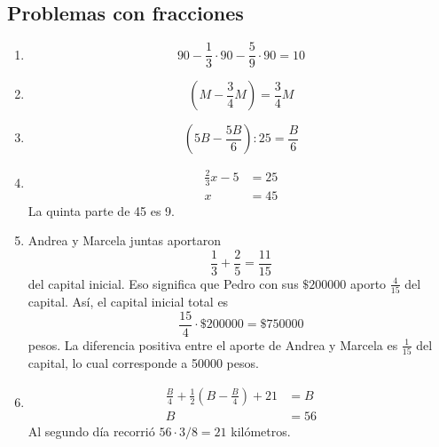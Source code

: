 \documentclass{sn-guia}
\begin{document}
\subsection{Problemas con fracciones}
\begin{enumerate}
    \item \begin{equation*}
        90 - \frac{1}{3}\cdot 90 - \frac{5}{9}\cdot 90 = 10
    \end{equation*}
    \item \begin{equation*}
        \left( M - \frac{3}{4}M \right) = \frac{3}{4}M
    \end{equation*}
    \item \begin{equation*}
        \left( 5B - \frac{5B}{6} \right): 25 = \frac{B}{6}
    \end{equation*}
    \item \begin{align*}
        \frac{2}{3}x - 5 &= 25 \\
        x &= 45
    \end{align*}
    La quinta parte de 45 es 9.
    \item Andrea y Marcela juntas aportaron 
    \begin{equation*}
        \frac{1}{3} + \frac{2}{5} = \frac{11}{15} 
    \end{equation*}
    del capital inicial. Eso significa que Pedro con sus $\$200000$ aporto $\frac{4}{15}$ del capital. Así, 
    el capital inicial total es
    \begin{equation*}
        \dfrac{15}{4}\cdot \$200000 = \$750000
    \end{equation*}
    pesos. 
    La diferencia positiva entre el aporte de Andrea y Marcela es $\frac{1}{15}$ del capital, lo cual 
    corresponde a 50000 pesos.
    \item \begin{align*}
        \frac{B}{4} + \frac{1}{2}\left( B - \frac{B}{4} \right) + 21 &= B\\
        B &= 56
    \end{align*}
    Al segundo día recorrió $56\cdot3/8 = 21$ kilómetros.
\end{enumerate}
\end{document}
